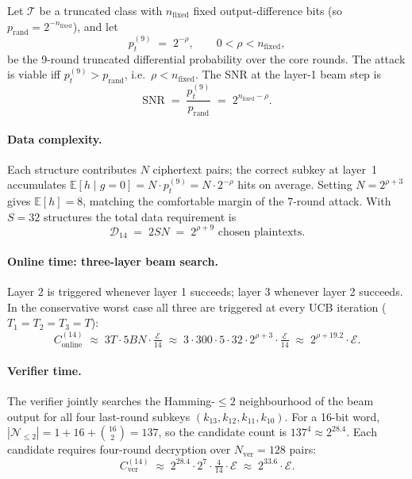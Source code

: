 \documentclass[runningheads]{llncs}
\begin{document}
Let $\mathcal{T}$ be a truncated class with $n_\mathrm{fixed}$
fixed output-difference bits (so $p_\mathrm{rand} = 2^{-n_\mathrm{fixed}}$),
and let
\[
  p_t^{(9)} \;=\; 2^{-\rho}, \qquad 0 < \rho < n_\mathrm{fixed},
\]
be the 9-round truncated differential probability over the core rounds.
The attack is viable iff $p_t^{(9)} > p_\mathrm{rand}$, i.e.\
$\rho < n_\mathrm{fixed}$.  The SNR at the layer-1 beam step is
\[
  \mathrm{SNR} \;=\;
  \frac{p_t^{(9)}}{p_\mathrm{rand}} \;=\; 2^{n_\mathrm{fixed} - \rho}.
\]

\paragraph{Data complexity.}

Each structure contributes $N$ ciphertext pairs; the correct subkey at
layer~1 accumulates $\mathbb{E}[h \mid g{=}0] = N \cdot p_t^{(9)} = N
\cdot 2^{-\rho}$ hits on average.  Setting $N = 2^{\rho+3}$ gives
$\mathbb{E}[h] = 8$, matching the comfortable margin of the 7-round
attack.  With $S = 32$ structures the total data requirement is
\begin{equation}
  \label{eq:data14}
  \mathcal{D}_{14} \;=\; 2SN \;=\; 2^{\rho+9} \text{ chosen plaintexts.}
\end{equation}

\paragraph{Online time: three-layer beam search.}

Layer 2 is triggered whenever layer 1 succeeds; layer 3 whenever layer 2
succeeds.  In the conservative worst case all three are triggered at every
UCB iteration ($T_1=T_2=T_3=T$):
\begin{equation}
  \label{eq:time14-online}
  C_\mathrm{online}^{(14)}
  \;\approx\;
  3T \cdot 5BN \cdot \tfrac{\mathcal{E}}{14}
  \;\approx\;
  3 \cdot 300 \cdot 5 \cdot 32 \cdot 2^{\rho+3} \cdot \tfrac{\mathcal{E}}{14}
  \;\approx\;
  2^{\rho+19.2} \cdot \mathcal{E}.
\end{equation}

\paragraph{Verifier time.}

The verifier jointly searches the Hamming-$\le 2$ neighbourhood of the
beam output for all four last-round subkeys
$(k_{13},k_{12},k_{11},k_{10})$.
For a 16-bit word, $|\mathcal{N}_{\le2}| = 1+16+\binom{16}{2} = 137$,
so the candidate count is $137^4 \approx 2^{28.4}$.  Each candidate
requires four-round decryption over $N_\mathrm{ver}=128$ pairs:
\begin{equation}
  \label{eq:time14-verify}
  C_\mathrm{ver}^{(14)}
  \;\approx\;
  2^{28.4} \cdot 2^7 \cdot \tfrac{4}{14} \cdot \mathcal{E}
  \;\approx\; 2^{33.6} \cdot \mathcal{E}.
\end{equation}
\end{document}
